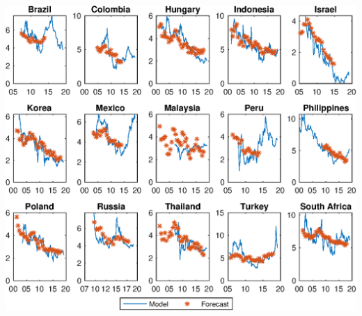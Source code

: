 \documentclass[12pt, aspectratio=169, xcolor=dvipsnames]{beamer}
\begin{document}
\begin{frame}[label=yPscbp]
\begin{center}							%
	\includegraphics[trim={0cm 0cm 0cm 0cm},clip,height=0.95\textheight,width=\linewidth]{../Figures/Estimation/bsl_yP_scbp.eps} \\
\end{center}
\end{frame}
\end{document}
